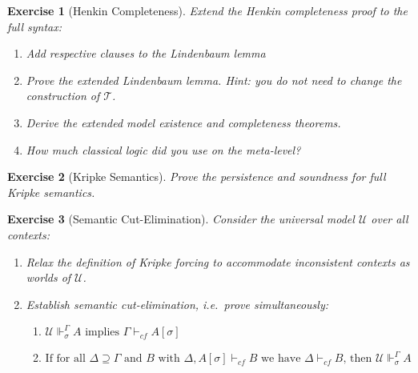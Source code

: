 \documentclass{article}
\newcommand{\TT}{\mathcal{T}}
\newcommand{\UU}{\mathcal U}
\newtheorem{exercise}{Exercise}
\begin{document}
\begin{exercise}[Henkin Completeness]
	Extend the Henkin completeness proof to the full syntax:
	\begin{enumerate}
		\item
		Add respective clauses to the Lindenbaum lemma
		\item 
		Prove the extended Lindenbaum lemma. Hint: you do not need to change the construction of $\TT$.
		\item
		Derive the extended model existence and completeness theorems.
		\item
		How much classical logic did you use on the meta-level?
	\end{enumerate}
\end{exercise}

\begin{exercise}[Kripke Semantics]
	Prove the persistence and soundness for full Kripke semantics.
\end{exercise}

\begin{exercise}[Semantic Cut-Elimination]
	Consider the universal model $\UU$ over all contexts:
	\begin{enumerate}
		\item
		Relax the definition of Kripke forcing to accommodate inconsistent contexts as worlds of $\UU$.
		\item
		Establish semantic cut-elimination, i.e.~prove simultaneously:
		\begin{enumerate}
			\item
			$\UU\Vdash^\Gamma_\sigma A \text{ implies } \Gamma\vdash_{cf}A[\sigma]$
			\item
			$\text{If for all $\Delta\supseteq \Gamma$ and $B$ with $\Delta,A[\sigma]\vdash_{cf} B$ we have $\Delta\vdash_{cf} B$, then $\UU\Vdash^\Gamma_\sigma A$} $
		\end{enumerate}
	\end{enumerate}
\end{exercise}
\end{document}
